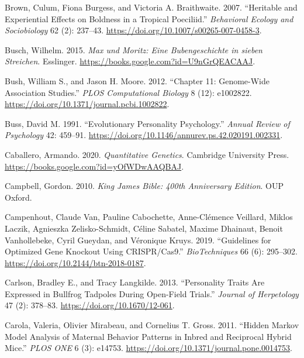\documentclass[
]{book}
\newlength{\cslhangindent}
\newlength{\cslentryspacingunit} %
\newenvironment{CSLReferences}[2] %
 {%
  \setlength{\parindent}{0pt}
  \ifodd #1
  \let\oldpar\par
  \def\par{\hangindent=\cslhangindent\oldpar}
  \fi
  \setlength{\parskip}{#2\cslentryspacingunit}
 }%
 {}
\begin{document}
\begin{CSLReferences}{1}{0}
\leavevmode{}%
Brown, Culum, Fiona Burgess, and Victoria A. Braithwaite. 2007. {``Heritable and Experiential Effects on Boldness in a Tropical Poeciliid.''} \emph{Behavioral Ecology and Sociobiology} 62 (2): 237--43. \url{https://doi.org/10.1007/s00265-007-0458-3}.

\leavevmode{}%
Busch, Wilhelm. 2015. \emph{Max und Moritz: Eine Bubengeschichte in sieben Streichen}. {Esslinger}. \url{https://books.google.com?id=U9nGrQEACAAJ}.

\leavevmode{}%
Bush, William S., and Jason H. Moore. 2012. {``Chapter 11: {Genome-Wide Association Studies}.''} \emph{PLOS Computational Biology} 8 (12): e1002822. \url{https://doi.org/10.1371/journal.pcbi.1002822}.

\leavevmode{}%
Buss, David M. 1991. {``Evolutionary Personality Psychology.''} \emph{Annual Review of Psychology} 42: 459--91. \url{https://doi.org/10.1146/annurev.ps.42.020191.002331}.

\leavevmode{}%
Caballero, Armando. 2020. \emph{Quantitative {Genetics}}. {Cambridge University Press}. \url{https://books.google.com?id=yOfWDwAAQBAJ}.

\leavevmode{}%
Campbell, Gordon. 2010. \emph{King {James Bible}: 400th {Anniversary Edition}}. {OUP Oxford}.

\leavevmode{}%
Campenhout, Claude Van, Pauline Cabochette, Anne-Clémence Veillard, Miklos Laczik, Agnieszka Zelisko-Schmidt, Céline Sabatel, Maxime Dhainaut, Benoit Vanhollebeke, Cyril Gueydan, and Véronique Kruys. 2019. {``Guidelines for Optimized Gene Knockout Using {CRISPR}/{Cas9}.''} \emph{BioTechniques} 66 (6): 295--302. \url{https://doi.org/10.2144/btn-2018-0187}.

\leavevmode{}%
Carlson, Bradley E., and Tracy Langkilde. 2013. {``Personality {Traits Are Expressed} in {Bullfrog Tadpoles} During {Open-Field Trials}.''} \emph{Journal of Herpetology} 47 (2): 378--83. \url{https://doi.org/10.1670/12-061}.

\leavevmode{}%
Carola, Valeria, Olivier Mirabeau, and Cornelius T. Gross. 2011. {``Hidden {Markov Model Analysis} of {Maternal Behavior Patterns} in {Inbred} and {Reciprocal Hybrid Mice}.''} \emph{PLOS ONE} 6 (3): e14753. \url{https://doi.org/10.1371/journal.pone.0014753}.


\end{CSLReferences}
\end{document}
